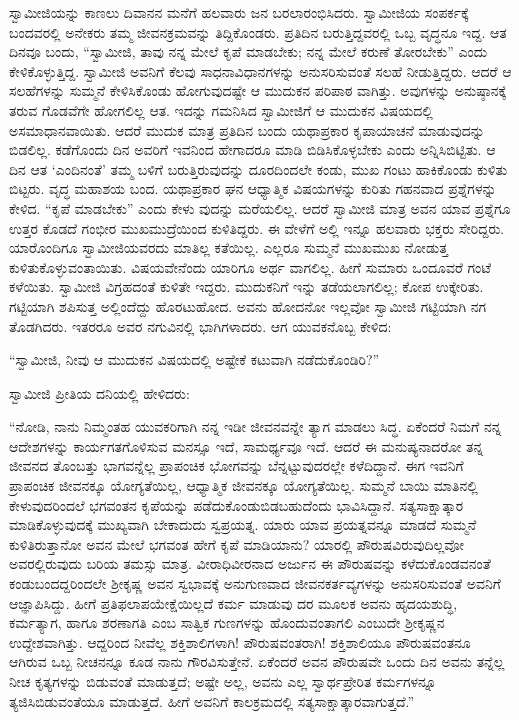 ಸ್ವಾಮೀಜಿಯನ್ನು ಕಾಣಲು ದಿವಾನನ ಮನೆಗೆ ಹಲವಾರು ಜನ ಬರಲಾರಂಭಿಸಿದರು. ಸ್ವಾಮೀಜಿಯ ಸಂಪರ್ಕಕ್ಕೆ ಬಂದವರಲ್ಲಿ ಅನೇಕರು ತಮ್ಮ ಜೀವನಕ್ರಮವನ್ನು ತಿದ್ದಿಕೊಂಡರು. ಪ್ರತಿದಿನ ಬರುತ್ತಿದ್ದವರಲ್ಲಿ ಒಬ್ಬ ವೃದ್ಧನೂ ಇದ್ದ. ಆತ ದಿನವೂ ಬಂದು, “ಸ್ವಾಮೀಜಿ, ತಾವು ನನ್ನ ಮೇಲೆ ಕೃಪೆ ಮಾಡಬೇಕು; ನನ್ನ ಮೇಲೆ ಕರುಣೆ ತೋರಬೇಕು” ಎಂದು ಕೇಳಿಕೊಳ್ಳುತ್ತಿದ್ದ. ಸ್ವಾಮೀಜಿ ಅವನಿಗೆ ಕೆಲವು ಸಾಧನಾವಿಧಾನಗಳನ್ನು ಅನುಸರಿಸುವಂತೆ ಸಲಹೆ ನೀಡುತ್ತಿದ್ದರು. ಆದರೆ ಆ ಸಲಹೆಗಳನ್ನು ಸುಮ್ಮನೆ ಕೇಳಿಸಿಕೊಂಡು ಹೋಗುವುದಷ್ಟೇ ಆ ಮುದುಕನ ಪರಿಪಾಠ ವಾಗಿತ್ತು. ಅವುಗಳನ್ನು ಅನುಷ್ಠಾನಕ್ಕೆ ತರುವ ಗೊಡವೆಗೇ ಹೋಗಲಿಲ್ಲ ಆತ. ಇದನ್ನು ಗಮನಿಸಿದ ಸ್ವಾಮೀಜಿಗೆ ಆ ಮುದುಕನ ವಿಷಯದಲ್ಲಿ ಅಸಮಾಧಾನವಾಯಿತು. ಆದರೆ ಮುದುಕ ಮಾತ್ರ ಪ್ರತಿದಿನ ಬಂದು ಯಥಾಪ್ರಕಾರ ಕೃಪಾಯಾಚನೆ ಮಾಡುವುದನ್ನು ಬಿಡಲಿಲ್ಲ. ಕಡೆಗೊಂದು ದಿನ ಅವರಿಗೆ ಇವನಿಂದ ಹೇಗಾದರೂ ಮಾಡಿ ಬಿಡಿಸಿಕೊಳ್ಳಬೇಕು ಎಂದು ಅನ್ನಿಸಿಬಿಟ್ಟಿತು. ಆ ದಿನ ಆತ ‘ಎಂದಿನಂತೆ’ ತಮ್ಮ ಬಳಿಗೆ ಬರುತ್ತಿರುವುದನ್ನು ದೂರದಿಂದಲೇ ಕಂಡು, ಮುಖ ಗಂಟು ಹಾಕಿಕೊಂಡು ಕುಳಿತು ಬಿಟ್ಟರು. ವೃದ್ಧ ಮಹಾಶಯ ಬಂದ. ಯಥಾಪ್ರಕಾರ ಘನ ಆಧ್ಯಾತ್ಮಿಕ ವಿಷಯಗಳನ್ನು ಕುರಿತು ಗಹನವಾದ ಪ್ರಶ್ನೆಗಳನ್ನು ಕೇಳಿದ. “ಕೃಪೆ ಮಾಡಬೇಕು” ಎಂದು ಕೇಳು ವುದನ್ನು ಮರೆಯಲಿಲ್ಲ. ಆದರೆ ಸ್ವಾಮೀಜಿ ಮಾತ್ರ ಅವನ ಯಾವ ಪ್ರಶ್ನೆಗೂ ಉತ್ತರ ಕೊಡದೆ ಗಂಭೀರ ಮುಖಮುದ್ರೆಯಿಂದ ಕುಳಿತಿದ್ದರು. ಈ ವೇಳೆಗೆ ಅಲ್ಲಿ ಇನ್ನೂ ಹಲವಾರು ಭಕ್ತರು ಸೇರಿದ್ದರು. ಯಾರೊಂದಿಗೂ ಸ್ವಾಮೀಜಿಯವರದು ಮಾತಿಲ್ಲ ಕತೆಯಿಲ್ಲ. ಎಲ್ಲರೂ ಸುಮ್ಮನೆ ಮುಖಮುಖ ನೋಡುತ್ತ ಕುಳಿತುಕೊಳ್ಳುವಂತಾಯಿತು. ವಿಷಯವೇನೆಂದು ಯಾರಿಗೂ ಅರ್ಥ ವಾಗಲಿಲ್ಲ. ಹೀಗೆ ಸುಮಾರು ಒಂದೂವರೆ ಗಂಟೆ ಕಳೆಯಿತು. ಸ್ವಾಮೀಜಿ ವಿಗ್ರಹದಂತೆ ಕುಳಿತೇ ಇದ್ದರು. ಮುದುಕನಿಗೆ ಇನ್ನು ತಡೆಯಲಾಗಲಿಲ್ಲ; ಕೋಪ ಉಕ್ಕೇರಿತು. ಗಟ್ಟಿಯಾಗಿ ಶಪಿಸುತ್ತ ಅಲ್ಲಿಂದೆದ್ದು ಹೊರಟುಹೋದ. ಅವನು ಹೋದನೋ ಇಲ್ಲವೋ ಸ್ವಾಮೀಜಿ ಗಟ್ಟಿಯಾಗಿ ನಗ ತೊಡಗಿದರು. ಇತರರೂ ಅವರ ನಗುವಿನಲ್ಲಿ ಭಾಗಿಗಳಾದರು. ಆಗ ಯುವಕನೊಬ್ಬ ಕೇಳಿದ:

“ಸ್ವಾಮೀಜಿ, ನೀವು ಆ ಮುದುಕನ ವಿಷಯದಲ್ಲಿ ಅಷ್ಟೇಕೆ ಕಟುವಾಗಿ ನಡೆದುಕೊಂಡಿರಿ?”

ಸ್ವಾಮೀಜಿ ಪ್ರೀತಿಯ ದನಿಯಲ್ಲಿ ಹೇಳಿದರು:

“ನೋಡಿ, ನಾನು ನಿಮ್ಮಂತಹ ಯುವಕರಿಗಾಗಿ ನನ್ನ ಇಡೀ ಜೀವನವನ್ನೇ ತ್ಯಾಗ ಮಾಡಲು ಸಿದ್ಧ. ಏಕೆಂದರೆ ನಿಮಗೆ ನನ್ನ ಆದೇಶಗಳನ್ನು ಕಾರ್ಯಗತಗೊಳಿಸುವ ಮನಸ್ಸೂ ಇದೆ, ಸಾಮರ್ಥ್ಯವೂ ಇದೆ. ಆದರೆ ಈ ಮನುಷ್ಯನಾದರೋ ತನ್ನ ಜೀವನದ ತೊಂಬತ್ತು ಭಾಗವನ್ನೆಲ್ಲ ಪ್ರಾಪಂಚಿಕ ಭೋಗವನ್ನು ಬೆನ್ನಟ್ಟುವುದರಲ್ಲೇ ಕಳೆದಿದ್ದಾನೆ. ಈಗ ಇವನಿಗೆ ಪ್ರಾಪಂಚಿಕ ಜೀವನಕ್ಕೂ ಯೋಗ್ಯತೆಯಿಲ್ಲ, ಆಧ್ಯಾತ್ಮಿಕ ಜೀವನಕ್ಕೂ ಯೋಗ್ಯತೆಯಿಲ್ಲ. ಸುಮ್ಮನೆ ಬಾಯಿ ಮಾತಿನಲ್ಲಿ ಕೇಳುವುದರಿಂದಲೆ ಭಗವಂತನ ಕೃಪೆಯನ್ನು ಪಡೆದುಕೊಂಡುಬಿಡಬಹುದೆಂದು ಭಾವಿಸಿದ್ದಾನೆ. ಸತ್ಯಸಾಕ್ಷಾತ್ಕಾರ ಮಾಡಿಕೊಳ್ಳುವುದಕ್ಕೆ ಮುಖ್ಯವಾಗಿ ಬೇಕಾದುದು ಸ್ವಪ್ರಯತ್ನ. ಯಾರು ಯಾವ ಪ್ರಯತ್ನವನ್ನೂ ಮಾಡದೆ ಸುಮ್ಮನೆ ಕುಳಿತಿರುತ್ತಾನೋ ಅವನ ಮೇಲೆ ಭಗವಂತ ಹೇಗೆ ಕೃಪೆ ಮಾಡಿಯಾನು? ಯಾರಲ್ಲಿ ಪೌರುಷವಿರುವುದಿಲ್ಲವೋ ಅವರಲ್ಲಿರುವುದು ಬರಿಯ ತಮಸ್ಸು ಮಾತ್ರ. ವೀರಾಧಿವೀರನಾದ ಅರ್ಜುನ ಈ ಪೌರುಷವನ್ನು ಕಳೆದುಕೊಂಡವನಂತೆ ಕಂಡುಬಂದದ್ದರಿಂದಲೇ ಶ್ರೀಕೃಷ್ಣ ಅವನ ಸ್ವಭಾವಕ್ಕೆ ಅನುಗುಣವಾದ ಜೀವನಕರ್ತವ್ಯಗಳನ್ನು ಅನುಸರಿಸುವಂತೆ ಅವನಿಗೆ ಆಜ್ಞಾಪಿಸಿದ್ದು. ಹೀಗೆ ಪ್ರತಿಫಲಾಪಯೇಕ್ಷೆಯಿಲ್ಲದೆ ಕರ್ಮ ಮಾಡುವು ದರ ಮೂಲಕ ಅವನು ಹೃದಯಶುದ್ಧಿ, ಕರ್ಮತ್ಯಾಗ, ಹಾಗೂ ಶರಣಾಗತಿ ಎಂಬ ಸಾತ್ವಿಕ ಗುಣಗಳನ್ನು ಹೊಂದುವಂತಾಗಲಿ ಎಂಬುದೇ ಶ್ರೀಕೃಷ್ಣನ ಉದ್ದೇಶವಾಗಿತ್ತು. ಆದ್ದರಿಂದ ನೀವೆಲ್ಲ ಶಕ್ತಿಶಾಲಿಗಳಾಗಿ! ಪೌರುಷವಂತರಾಗಿ! ಶಕ್ತಿಶಾಲಿಯೂ ಪೌರುಷವಂತನೂ ಆಗಿರುವ ಒಬ್ಬ ನೀಚನನ್ನೂ ಕೂಡ ನಾನು ಗೌರವಿಸುತ್ತೇನೆ. ಏಕೆಂದರೆ ಅವನ ಪೌರುಷವೇ ಒಂದು ದಿನ ಅವನು ತನ್ನೆಲ್ಲ ನೀಚ ಕೃತ್ಯಗಳನ್ನು ಬಿಡುವಂತೆ ಮಾಡುತ್ತದೆ; ಅಷ್ಟೇ ಅಲ್ಲ, ಅವನು ಎಲ್ಲ ಸ್ವಾರ್ಥಪ್ರೇರಿತ ಕರ್ಮಗಳನ್ನೂ ತ್ಯಜಿಸಿಬಿಡುವಂತೆಯೂ ಮಾಡುತ್ತದೆ. ಹೀಗೆ ಅವನಿಗೆ ಕಾಲಕ್ರಮದಲ್ಲಿ ಸತ್ಯಸಾಕ್ಷಾತ್ಕಾರವಾಗುತ್ತದೆ.”

